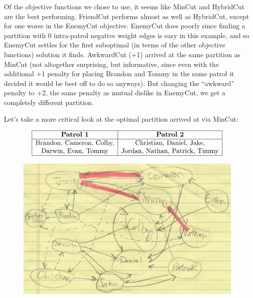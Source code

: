 \documentclass{amsart}
\theoremstyle{definition}
\theoremstyle{remark}
\numberwithin{equation}{section}
\begin{document}
Of the objective functions we chose to use, it seems like MinCut and HybridCut are the best performing. FriendCut performs almost as well as HybridCut, except for one worse in the EnemyCut objective. EnemyCut does poorly since finding a partition with 0 intra-patrol negative weight edges is easy in this example, and so EnemyCut settles for the first suboptimal (in terms of the other objective functions) solution it finds. AwkwardCut (+1) arrived at the same partition as MinCut (not altogether surprising, but informative, since even with the additional +1 penalty for placing Brandon and Tommy in the same patrol it decided it would be best off to do so anyways). But changing the ``awkward'' penalty to +2, the same penalty as mutual dislike in EnemyCut, we get a completely different partition.

Let's take a more critical look at the optimal partition arrived at via MinCut:

\begin{table}[h]
	\caption{}\label{eqtable}
	\renewcommand\arraystretch{1.5}
	\noindent\[
	\begin{array}{|c|c|}
	\hline
	\textbf{Patrol 1}&\textbf{Patrol 2}\\
	\hline
	\text{Brandon, Cameron, Colby,}&\text{Christian, Daniel, Jake,}\\
	\text{Darwin, Evan, Tommy}&\text{Jordan, Nathan, Patrick, Timmy}\\
	\hline
	\end{array}
	\]
\end{table}
\begin{figure}[h]
    \centering
    \includegraphics[scale=0.60]{graph}
\end{figure}
\end{document}
